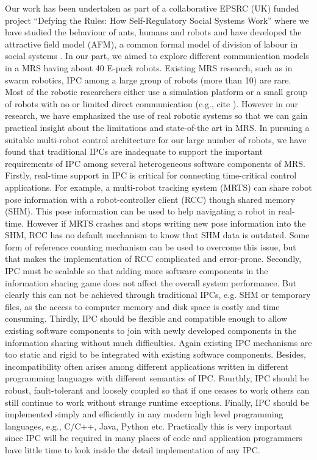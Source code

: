 \documentclass{ifacconf}
\begin{document}
Our work has been undertaken as part of a collaborative EPSRC (UK) funded project ``Defying the Rules: How Self-Regulatory Social Systems Work'' where we have studied the behaviour of ants, humans and robots and have developed the attractive field model (AFM), a common formal model of division of labour in social systems \cite{Elsa}. In our part, we aimed to  explore different communication models in a MRS having about 40 E-puck robots.  Existing MRS research, such as in swarm robotics, IPC among a large group of robots (more than 10) are rare. Most of the robotic researchers either use a simulation platform or a small group of robots with no or limited direct communication (e.g., cite ).   However in our research, we have emphasized the use of real robotic systems so that we can gain practical insight about the limitations and state-of-the art in MRS. In pursuing a suitable multi-robot control architecture for our large number of robots, we have found that traditional IPCs are inadequate to support the important requirements of IPC among several heterogeneous software components of MRS. Firstly, real-time support in IPC is critical for connecting time-critical control applications. For example, a multi-robot tracking system (MRTS) can share robot pose information with a robot-controller client (RCC) though shared memory (SHM). This pose information can be used to help navigating a robot in real-time. However if MRTS crashes and stops writing new pose information into the SHM, RCC has no default mechanism to know that SHM data is outdated. Some form of reference counting mechanism can be used to overcome this issue, but that makes the implementation of RCC complicated and error-prone. Secondly, IPC must be scalable so that adding more software components in the information sharing game does not affect the overall system performance. But clearly this can not be achieved through traditional IPCs, e.g. SHM or temporary files,  as the access to computer memory and disk space is costly and time consuming. Thirdly, IPC should be flexible and compatible enough to allow existing software components to join with newly developed components in the information sharing without much difficulties. Again existing IPC mechanisms are too static and rigid to be integrated with existing software components. Besides, incompatibility often arises among different applications written in different programming languages with different semantics of IPC. Fourthly, IPC should be robust, fault-tolerant and loosely coupled so that if one ceases to work others can still continue to work without strange runtime exceptions. Finally, IPC should be implemented simply and efficiently in any modern high level programming languages, e.g., C/C++, Java, Python etc. Practically this is very important since IPC will be required in many places of code and application programmers have little time to look inside the detail implementation of any IPC.\\
\end{document}
